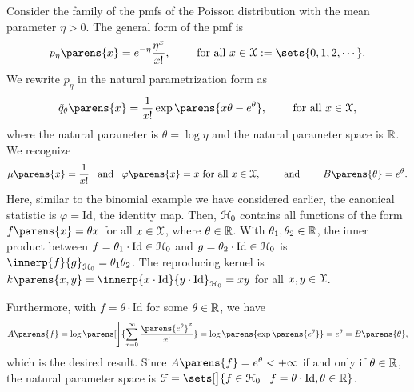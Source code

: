 
\begin{example}
	Consider the family of the pmfs of the Poisson distribution with the mean parameter $\eta > 0$. The general form of the pmf is 
	\begin{align*}
		p_{\eta} \parens{x} = e^{-\eta} \frac{\eta^x}{x!}, \qquad \text{ for all } x \in \calX := \sets{0, 1, 2, \cdots}.  
	\end{align*}
	We rewrite $p_{\eta}$ in the natural parametrization form as 
	\begin{align*}
		\tilde{q}_{\theta} \parens{x} = \frac{1}{x!} \exp \parens{x \theta - e^{\theta}}, \qquad \text{ for all } x \in \calX, 
	\end{align*}
	where the natural parameter is $\theta = \log \eta$ and the natural parameter space is $\mathbb{R}$. We recognize 
	\begin{align*}
		\mu \parens{x} = \frac{1}{x!} \enspace \text{ and } \enspace \varphi \parens{x} = x \text{ for all } x \in \calX, \qquad \text{ and } \qquad B \parens{\theta} = e^\theta. 
		\end{align*}
	Here, similar to the binomial example we have considered earlier, the canonical statistic is $\varphi = \mathrm{Id}$, the identity map. Then, $\mathcal{H}_0$ contains all functions of the form $f \parens{x} = \theta x$ for all $x \in \mathcal{X}$, where $\theta \in \mathbb{R}$. With $\theta_1, \theta_2 \in \mathbb{R}$, the inner product between $f = \theta_1 \cdot \mathrm{Id} \in \mathcal{H}_0$ and $g = \theta_2 \cdot \mathrm{Id} \in \mathcal{H}_0$ is $\innerp{f}{g}_{\calH_0} = \theta_1 \theta_2$. The reproducing kernel is $k \parens{x, y} = \innerp{x \cdot \mathrm{Id}}{y \cdot \mathrm{Id} }_{\hil_0} = x y$ for all $x, y \in \mathcal{X}$. 
	
	Furthermore, with $f = \theta \cdot \mathrm{Id}$ for some $\theta \in \mathbb{R}$, we have 
	\begin{align*}
		A \parens{f} %
		= \log \parens[\Bigg]{\sum_{x=0}^{\infty} \frac{\parens{e^{\theta}}^x}{x!} } 
		= \log \parens{\exp \parens{e^\theta}} = e^\theta = B \parens{\theta}, 
	\end{align*}
	which is the desired result. Since $A \parens{f} = e^{\theta} < + \infty$ if and only if $\theta \in \mathbb{R}$, the natural parameter space is $\calF = \sets[\big]{f \in \calH_0 \mid f = \theta \cdot \mathrm{Id}, \theta \in \Real}$. 
\end{example}

